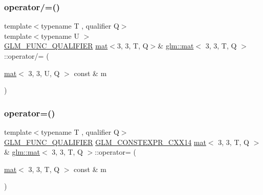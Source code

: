 \mbox{\label{structglm_1_1mat_3_013_00_013_00_01_t_00_01_q_01_4_a9fea79c2d1b00d77863a64dad3ddb1af}} 
\subsubsection{\texorpdfstring{operator/=()}{operator/=()}\hspace{0.1cm}{\footnotesize\ttfamily [4/4]}}
{\footnotesize\ttfamily template$<$typename T , qualifier Q$>$ \\
template$<$typename U $>$ \\
\mbox{\hyperlink{setup_8hpp_a33fdea6f91c5f834105f7415e2a64407}{G\+L\+M\+\_\+\+F\+U\+N\+C\+\_\+\+Q\+U\+A\+L\+I\+F\+I\+ER}} \mbox{\hyperlink{structglm_1_1mat}{mat}}$<$3, 3, T, Q$>$\& \mbox{\hyperlink{structglm_1_1mat}{glm\+::mat}}$<$ 3, 3, T, Q $>$\+::operator/= (\begin{DoxyParamCaption}\item[{\mbox{\hyperlink{structglm_1_1mat}{mat}}$<$ 3, 3, U, Q $>$ const \&}]{m }\end{DoxyParamCaption})}

\mbox{\label{structglm_1_1mat_3_013_00_013_00_01_t_00_01_q_01_4_a9bf859c0e00be258390fdab15e7faaf1}} 
\subsubsection{\texorpdfstring{operator=()}{operator=()}\hspace{0.1cm}{\footnotesize\ttfamily [1/3]}}
{\footnotesize\ttfamily template$<$typename T , qualifier Q$>$ \\
\mbox{\hyperlink{setup_8hpp_a33fdea6f91c5f834105f7415e2a64407}{G\+L\+M\+\_\+\+F\+U\+N\+C\+\_\+\+Q\+U\+A\+L\+I\+F\+I\+ER}} \mbox{\hyperlink{setup_8hpp_a4dd12abf5e1164bc57f3a34671d03844}{G\+L\+M\+\_\+\+C\+O\+N\+S\+T\+E\+X\+P\+R\+\_\+\+C\+X\+X14}} \mbox{\hyperlink{structglm_1_1mat}{mat}}$<$ 3, 3, T, Q $>$ \& \mbox{\hyperlink{structglm_1_1mat}{glm\+::mat}}$<$ 3, 3, T, Q $>$\+::operator= (\begin{DoxyParamCaption}\item[{\mbox{\hyperlink{structglm_1_1mat}{mat}}$<$ 3, 3, T, Q $>$ const \&}]{m }\end{DoxyParamCaption})}

